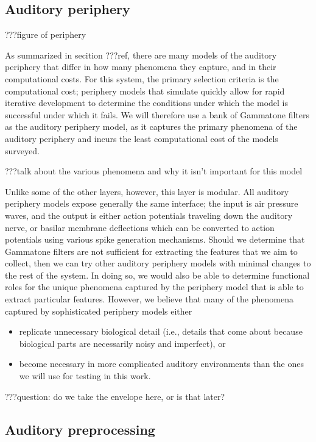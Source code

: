 \subsection{Auditory periphery}

???figure of periphery

As summarized in secition ???ref,
there are many models of the auditory periphery
that differ in how many phenomena they capture,
and in their computational costs.
For this system,
the primary selection criteria is
the computational cost;
periphery models that simulate quickly
allow for rapid iterative development
to determine the conditions
under which the model is successful
under which it fails.
We will therefore use
a bank of Gammatone filters as the
auditory periphery model,
as it captures the primary phenomena
of the auditory periphery
and incurs the least computational cost
of the models surveyed.

???talk about the various phenomena
and why it isn't important for this model

Unlike some of the other layers, however,
this layer is modular.
All auditory periphery models expose
generally the same interface;
the input is air pressure waves,
and the output is either action potentials
traveling down the auditory nerve,
or basilar membrane deflections
which can be converted to action potentials
using various spike generation mechanisms.
Should we determine that Gammatone filters
are not sufficient for extracting
the features that we aim to collect,
then we can try other auditory periphery models
with minimal changes to the rest of the system.
In doing so, we would also be able to
determine functional roles for the
unique phenomena captured by the
periphery model that is able to extract particular features.
However, we believe that many
of the phenomena captured
by sophisticated periphery models either
\begin{itemize}
\item replicate unnecessary biological detail
  (i.e., details that come about because biological parts
  are necessarily noisy and imperfect), or
\item become necessary in more complicated
  auditory environments than the ones
  we will use for testing in this work.
\end{itemize}

???question: do we take the envelope here,
or is that later?

\subsection{Auditory preprocessing}

